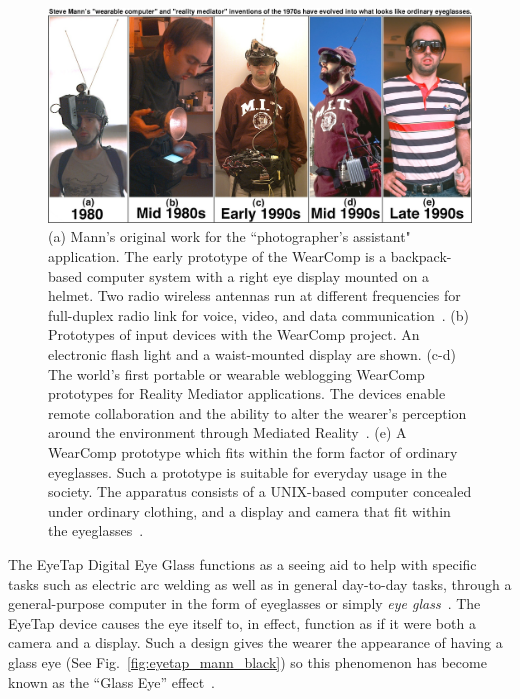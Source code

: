 \begin{figure}[htb]
\center
 \includegraphics[width=5.5in]{ch1/figures/steve5.jpeg}
 \caption{(a) Mann's original work for the ``photographer's assistant" application. The early prototype 
of the WearComp is a backpack-based computer system with a right eye display mounted on a 
helmet. Two radio wireless antennas run at different frequencies for full-duplex radio link for voice, 
video, and data communication~\cite{mann1994mediated}. (b) Prototypes of input devices with the WearComp 
project. An electronic flash light and a waist-mounted display are shown. (c-d) The world's first portable or 
wearable weblogging WearComp prototypes for Reality Mediator applications. The devices enable 
remote collaboration and the ability to alter the wearer's perception around the environment through 
Mediated Reality~\cite{mann1994mediated}. (e) A WearComp prototype which fits within the form 
factor of ordinary eyeglasses. Such a prototype is suitable for everyday usage in the society. The 
apparatus consists of a UNIX-based computer concealed under ordinary clothing, and a display and 
camera that fit within the eyeglasses~\cite{intelligentimageprocessing}.}
 \label{fig:mannglass}
\end{figure}

The EyeTap Digital Eye Glass functions as a seeing aid to help with specific tasks such as electric arc 
welding as well as in general day-to-day tasks, through a general-purpose computer in the form of 
eyeglasses or simply \emph{eye glass}~\cite{intelligentimageprocessing}. The EyeTap device causes 
the eye itself to, in effect, function as if it were both a camera and a display. Such a design gives the 
wearer the appearance of having a glass eye (See Fig.~\ref{fig:eyetap_mann_black}) so this 
phenomenon has become known as the ``Glass Eye'' effect~\cite{mann260}. 

